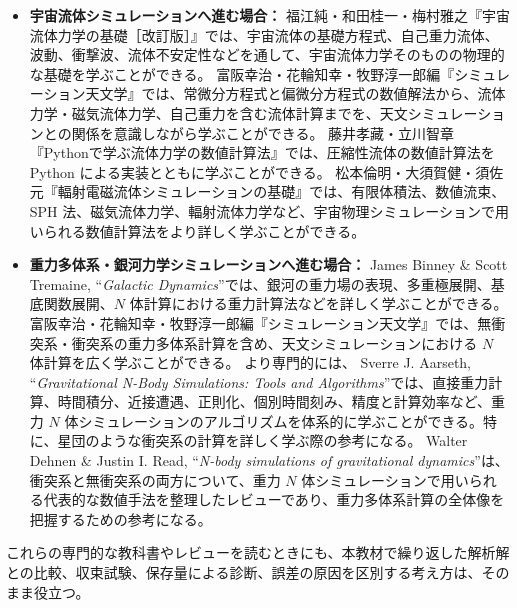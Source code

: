 \begin{itemize}
  \item \textbf{宇宙流体シミュレーションへ進む場合：}
  福江純・和田桂一・梅村雅之『宇宙流体力学の基礎［改訂版］』\cite{fukue2022}では、宇宙流体の基礎方程式、自己重力流体、波動、衝撃波、流体不安定性などを通して、宇宙流体力学そのものの物理的な基礎を学ぶことができる。
  富阪幸治・花輪知幸・牧野淳一郎編『シミュレーション天文学』\cite{tomisaka2007}では、常微分方程式と偏微分方程式の数値解法から、流体力学・磁気流体力学、自己重力を含む流体計算までを、天文シミュレーションとの関係を意識しながら学ぶことができる。
  藤井孝藏・立川智章『Pythonで学ぶ流体力学の数値計算法』\cite{fujii2020}では、圧縮性流体の数値計算法を Python による実装とともに学ぶことができる。
  松本倫明・大須賀健・須佐元『輻射電磁流体シミュレーションの基礎』\cite{matsumoto}では、有限体積法、数値流束、SPH 法、磁気流体力学、輻射流体力学など、宇宙物理シミュレーションで用いられる数値計算法をより詳しく学ぶことができる。

  \item \textbf{重力多体系・銀河力学シミュレーションへ進む場合：}
  James Binney \& Scott Tremaine, ``\textit{Galactic Dynamics}''\cite{bt2008}では、銀河の重力場の表現、多重極展開、基底関数展開、$N$ 体計算における重力計算法などを詳しく学ぶことができる。
  富阪幸治・花輪知幸・牧野淳一郎編『シミュレーション天文学』\cite{tomisaka2007}では、無衝突系・衝突系の重力多体系計算を含め、天文シミュレーションにおける $N$ 体計算を広く学ぶことができる。
  より専門的には、
  Sverre J. Aarseth, ``\textit{Gravitational N-Body Simulations: Tools and Algorithms}''\cite{aarseth2003}では、直接重力計算、時間積分、近接遭遇、正則化、個別時間刻み、精度と計算効率など、重力 $N$ 体シミュレーションのアルゴリズムを体系的に学ぶことができる。特に、星団のような衝突系の計算を詳しく学ぶ際の参考になる。
  Walter Dehnen \& Justin I. Read, ``\textit{N-body simulations of gravitational dynamics}''\cite{dehnen2011}は、衝突系と無衝突系の両方について、重力 $N$ 体シミュレーションで用いられる代表的な数値手法を整理したレビューであり、重力多体系計算の全体像を把握するための参考になる。
\end{itemize}

これらの専門的な教科書やレビューを読むときにも、本教材で繰り返した解析解との比較、収束試験、保存量による診断、誤差の原因を区別する考え方は、そのまま役立つ。
